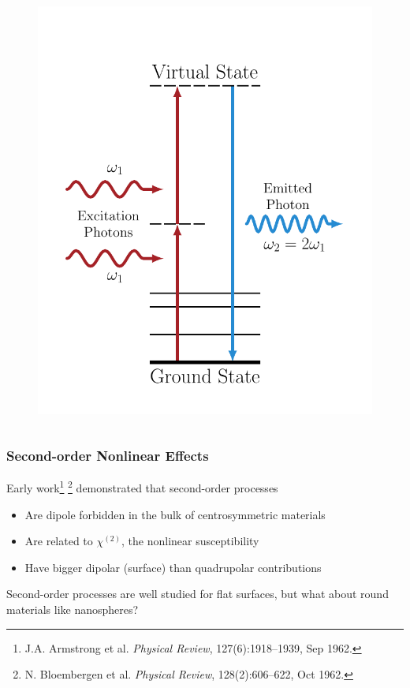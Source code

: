 \documentclass{beamer}
\begin{document}
\begin{frame}
\begin{columns}
\begin{figure}
\includegraphics[width=\textwidth]{diag-levelsshg}
\end{figure}
\end{columns}
\end{frame}

\begin{frame}
\frametitle{Second-order Nonlinear Effects}
Early work\footnote{J.A. Armstrong et al. \emph{Physical Review}, 127(6):1918--1939, Sep 1962.} \footnote{N. Bloembergen et al. \emph{Physical Review}, 128(2):606--622, Oct 1962.} demonstrated that second-order processes
\begin{itemize}
\item Are dipole forbidden in the bulk of centrosymmetric materials
\item Are related to $\chi^{(2)}$, the nonlinear susceptibility
\item Have bigger dipolar (surface) than quadrupolar contributions
\end{itemize}\vfill
\begin{center}
Second-order processes are well studied for flat surfaces, but what about round materials like nanospheres?
\end{center}
\end{frame}
\end{document}
